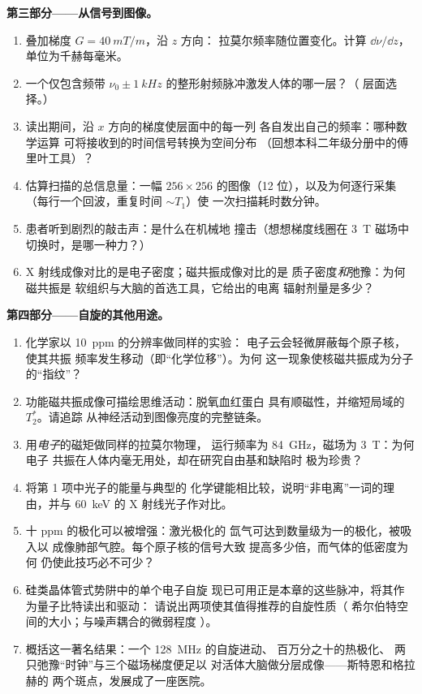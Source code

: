 \begin{problem}
\medskip\noindent\textbf{第三部分——从信号到图像。}
\begin{enumerate}[resume]
  \item 叠加梯度 $G = \qty{40}{mT/m}$，沿 $z$ 方向：
        拉莫尔频率随位置变化。计算
        $\dd\nu/\dd z$，单位为千赫每毫米。
  \item 一个仅包含频带 $\nu_0 \pm
        \qty{1}{kHz}$ 的整形射频脉冲激发人体的哪一层？（
        层面选择。）
  \item 读出期间，沿 $x$ 方向的梯度使层面中的每一列
        各自发出自己的频率：哪种数学运算
        可将接收到的时间信号转换为空间分布
        （回想本科二年级分册中的傅里叶工具）？
  \item 估算扫描的总信息量：一幅 $256 \times 256$
        的图像（12 位），以及为何逐行采集
        （每行一个回波，重复时间 $\sim T_1$）使
        一次扫描耗时数分钟。
  \item 患者听到剧烈的敲击声：是什么在机械地
        撞击（想想梯度线圈在
        \qty{3}{T} 磁场中切换时，是哪一种力？）
  \item X 射线成像对比的是电子密度；磁共振成像对比的是
        质子密度\emph{和}弛豫：为何磁共振是
        软组织与大脑的首选工具，它给出的电离
        辐射剂量是多少？
\end{enumerate}

\medskip\noindent\textbf{第四部分——自旋的其他用途。}
\begin{enumerate}[resume]
  \item 化学家以 \qty{10}{ppm} 的分辨率做同样的实验：
        电子云会轻微屏蔽每个原子核，使其共振
        频率发生移动（即“化学位移”）。为何
        这一现象使核磁共振成为分子的“指纹”？
  \item 功能磁共振成像可描绘思维活动：脱氧血红蛋白
        具有顺磁性，并缩短局域的 $T_2^*$。请追踪
        从神经活动到图像亮度的完整链条。
  \item 用\emph{电子}的磁矩做同样的拉莫尔物理，
        运行频率为 \qty{84}{GHz}，磁场为 \qty{3}{T}：为何电子
        共振在人体内毫无用处，却在研究自由基和缺陷时
        极为珍贵？
  \item 将第 1 项中光子的能量与典型的
        化学键能相比较，说明“非电离”一词的理由，并与
        \qty{60}{keV} 的 X 射线光子作对比。
  \item 十 ppm 的极化可以被增强：激光极化的
        氙气可达到数量级为一的极化，被吸入以
        成像肺部气腔。每个原子核的信号大致
        提高多少倍，而气体的低密度为何
        仍使此技巧必不可少？
  \item 硅类晶体管式势阱中的单个电子自旋
        现已可用正是本章的这些脉冲，将其作为量子比特读出和驱动：
        请说出两项使其值得推荐的自旋性质（
        希尔伯特空间的大小；与噪声耦合的微弱程度
        ）。
  \item 概括这一著名结果：一个 \qty{128}{MHz} 的自旋进动、
        百万分之十的热极化、
        两只弛豫“时钟”与三个磁场梯度便足以
        对活体大脑做分层成像——斯特恩和格拉赫的
        两个斑点，发展成了一座医院。
\end{enumerate}
\end{problem}
